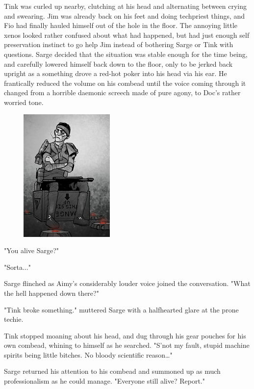 Tink was curled up nearby, clutching at his head and alternating between crying and swearing. 
Jim was already back on his feet and doing techpriest things, and Fio had finally hauled himself out of the hole in the floor. 
The annoying little xenos looked rather confused about what had happened, but had just enough self preservation instinct to go help Jim instead of bothering Sarge or Tink with questions. 
Sarge decided that the situation was stable enough for the time being, and carefully lowered himself back down to the floor, only to be jerked back upright as a something drove a red-hot poker into his head via his ear. 
He frantically reduced the volume on his combead until the voice coming through it changed from a horrible daemonic screech made of pure agony, to Doc's rather worried tone.

\begin{figure}
	\begin{center}
		\includegraphics[width=\figwidth]{pics/13/17.png}
	\end{center}
\end{figure}
"You alive Sarge?"

"Sorta..."

Sarge flinched as Aimy's considerably louder voice joined the conversation. 
"What the hell happened down there?"

"Tink broke something." muttered Sarge with a halfhearted glare at the prone techie. 


Tink stopped moaning about his head, and dug through his gear pouches for his own combead, whining to himself as he searched. 
"S'not my fault, stupid machine spirits being little bitches. 
No bloody scientific reason…"

Sarge returned his attention to his combead and summoned up as much professionalism as he could manage. 
"Everyone still alive? 
Report."

